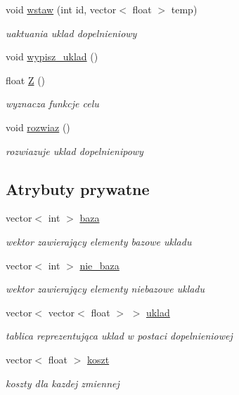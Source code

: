 \begin{DoxyCompactItemize}
void \hyperlink{classsimplex_a2db70133c6840b7fffc8e0217741de97}{wstaw} (int id, vector$<$ float $>$ temp)
\begin{DoxyCompactList}\small\item\em uaktuania uklad dopelnieniowy \end{DoxyCompactList}\item 
void \hyperlink{classsimplex_a46c4d51fcef4befe914d345f72aa3d08}{wypisz\-\_\-uklad} ()
\item 
float \hyperlink{classsimplex_a78b3d773b6403ea66e8686a96264539e}{Z} ()
\begin{DoxyCompactList}\small\item\em wyznacza funkcje celu \end{DoxyCompactList}\item 
void \hyperlink{classsimplex_ad0c133a2663414492c312b4d5379b91a}{rozwiaz} ()
\begin{DoxyCompactList}\small\item\em rozwiazuje uklad dopelnienipowy \end{DoxyCompactList}\end{DoxyCompactItemize}
\subsection*{Atrybuty prywatne}
\begin{DoxyCompactItemize}
\item 
vector$<$ int $>$ \hyperlink{classsimplex_a870de9b2f70ddb41b656f5461c5a4a8f}{baza}
\begin{DoxyCompactList}\small\item\em wektor zawierający elementy bazowe ukladu \end{DoxyCompactList}\item 
vector$<$ int $>$ \hyperlink{classsimplex_a24839e2b65652a1441280682657ee062}{nie\-\_\-baza}
\begin{DoxyCompactList}\small\item\em wektor zawierający elementy niebazowe ukladu \end{DoxyCompactList}\item 
vector$<$ vector$<$ float $>$ $>$ \hyperlink{classsimplex_a7161bd824b374ca4db44066f8909d024}{uklad}
\begin{DoxyCompactList}\small\item\em tablica reprezentująca uklad w postaci dopelnieniowej \end{DoxyCompactList}\item 
vector$<$ float $>$ \hyperlink{classsimplex_a2c4cdad075abffe54b4a6decc6f0a55e}{koszt}
\begin{DoxyCompactList}\small\item\em koszty dla kazdej zmiennej \end{DoxyCompactList}\end{DoxyCompactItemize}


